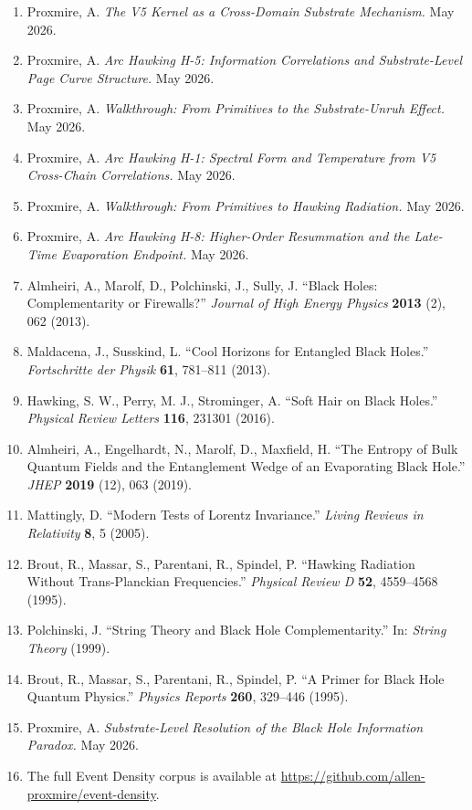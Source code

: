 \documentclass[11pt,a4paper]{article}
\begin{document}
\begin{enumerate}[noitemsep,leftmargin=*]
\item Proxmire, A. \textit{The V5 Kernel as a Cross-Domain Substrate Mechanism.} May 2026.
\item Proxmire, A. \textit{Arc Hawking H-5: Information Correlations and Substrate-Level Page Curve Structure.} May 2026.
\item Proxmire, A. \textit{Walkthrough: From Primitives to the Substrate-Unruh Effect.} May 2026.
\item Proxmire, A. \textit{Arc Hawking H-1: Spectral Form and Temperature from V5 Cross-Chain Correlations.} May 2026.
\item Proxmire, A. \textit{Walkthrough: From Primitives to Hawking Radiation.} May 2026.
\item Proxmire, A. \textit{Arc Hawking H-8: Higher-Order Resummation and the Late-Time Evaporation Endpoint.} May 2026.
\item Almheiri, A., Marolf, D., Polchinski, J., Sully, J. ``Black Holes: Complementarity or Firewalls?'' \textit{Journal of High Energy Physics} \textbf{2013} (2), 062 (2013).
\item Maldacena, J., Susskind, L. ``Cool Horizons for Entangled Black Holes.'' \textit{Fortschritte der Physik} \textbf{61}, 781--811 (2013).
\item Hawking, S. W., Perry, M. J., Strominger, A. ``Soft Hair on Black Holes.'' \textit{Physical Review Letters} \textbf{116}, 231301 (2016).
\item Almheiri, A., Engelhardt, N., Marolf, D., Maxfield, H. ``The Entropy of Bulk Quantum Fields and the Entanglement Wedge of an Evaporating Black Hole.'' \textit{JHEP} \textbf{2019} (12), 063 (2019).
\item Mattingly, D. ``Modern Tests of Lorentz Invariance.'' \textit{Living Reviews in Relativity} \textbf{8}, 5 (2005).
\item Brout, R., Massar, S., Parentani, R., Spindel, P. ``Hawking Radiation Without Trans-Planckian Frequencies.'' \textit{Physical Review D} \textbf{52}, 4559--4568 (1995).
\item Polchinski, J. ``String Theory and Black Hole Complementarity.'' In: \textit{String Theory} (1999).
\item Brout, R., Massar, S., Parentani, R., Spindel, P. ``A Primer for Black Hole Quantum Physics.'' \textit{Physics Reports} \textbf{260}, 329--446 (1995).
\item Proxmire, A. \textit{Substrate-Level Resolution of the Black Hole Information Paradox.} May 2026.
\item The full Event Density corpus is available at \url{https://github.com/allen-proxmire/event-density}.
\end{enumerate}
\end{document}
